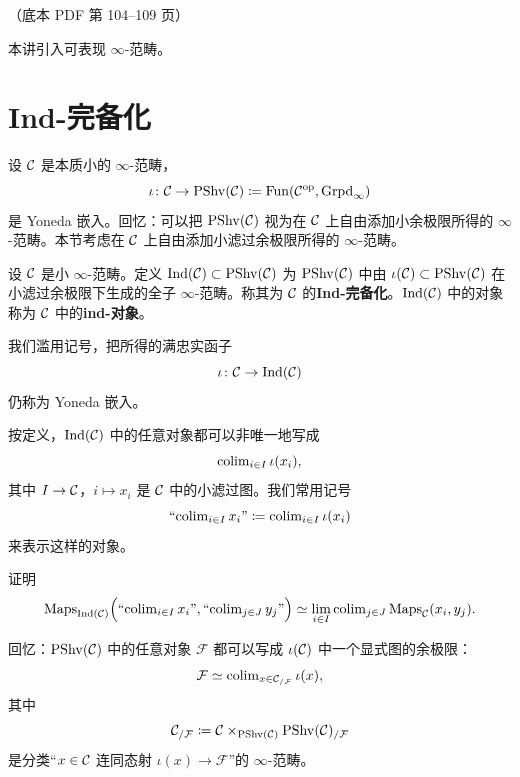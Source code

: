 \begin{center}\small\color{black!55}（底本 PDF 第 104–109 页）\end{center}

本讲引入可表现 $\infty$-范畴。

\section{Ind-完备化}

\nitem\label{L13-1.1} 设 $\mathcal{C}$ 是本质小的 $\infty$-范畴，
\[
\iota\colon\mathcal{C}\to\mathrm{PShv}(\mathcal{C})\coloneqq\operatorname{Fun}(\mathcal{C}^{\mathrm{op}},\operatorname{Grpd}_\infty)
\]
是 Yoneda 嵌入。回忆：可以把 $\mathrm{PShv}(\mathcal{C})$ 视为在 $\mathcal{C}$ 上自由添加小余极限所得的 $\infty$-范畴。本节考虑在 $\mathcal{C}$ 上自由添加小滤过余极限所得的 $\infty$-范畴。

\begin{definition}\label{L13-1.2}
设 $\mathcal{C}$ 是小 $\infty$-范畴。定义 $\operatorname{Ind}(\mathcal{C})\subset\mathrm{PShv}(\mathcal{C})$ 为 $\mathrm{PShv}(\mathcal{C})$ 中由 $\iota(\mathcal{C})\subset\mathrm{PShv}(\mathcal{C})$ 在小滤过余极限下生成的全子 $\infty$-范畴。称其为 $\mathcal{C}$ 的\textbf{Ind-完备化}。$\operatorname{Ind}(\mathcal{C})$ 中的对象称为 $\mathcal{C}$ 中的\textbf{ind-对象}。

我们滥用记号，把所得的满忠实函子
\[
\iota\colon\mathcal{C}\to\operatorname{Ind}(\mathcal{C})
\]
仍称为 Yoneda 嵌入。
\end{definition}


\nitem\label{L13-1.3} 按定义，$\operatorname{Ind}(\mathcal{C})$ 中的任意对象都可以非唯一地写成
\[
\operatorname{colim}_{i\in I}\iota(x_i),
\]
其中 $I\to\mathcal{C}$，$i\mapsto x_i$ 是 $\mathcal{C}$ 中的小滤过图。我们常用记号
\[
\text{“$\operatorname{colim}_{i\in I}x_i$”}\coloneqq\operatorname{colim}_{i\in I}\iota(x_i)
\]
来表示这样的对象。

\begin{exercise}\label{L13-1.4}
证明
\[
\mathrm{Maps}_{\operatorname{Ind}(\mathcal{C})}\Big(\text{“$\operatorname{colim}_{i\in I}x_i$”},\text{“$\operatorname{colim}_{j\in J}y_j$”}\Big)\simeq\lim_{i\in I}\operatorname{colim}_{j\in J}\mathrm{Maps}_{\mathcal{C}}(x_i,y_j).
\]
\end{exercise}

\nitem\label{L13-1.5} 回忆：$\mathrm{PShv}(\mathcal{C})$ 中的任意对象 $\mathcal{F}$ 都可以写成 $\iota(\mathcal{C})$ 中一个显式图的余极限：
\[
\mathcal{F}\simeq\operatorname{colim}_{x\in\mathcal{C}_{/\mathcal{F}}}\iota(x),
\]
其中
\[
\mathcal{C}_{/\mathcal{F}}\coloneqq\mathcal{C}\times_{\mathrm{PShv}(\mathcal{C})}\mathrm{PShv}(\mathcal{C})_{/\mathcal{F}}
\]
是分类“$x\in\mathcal{C}$ 连同态射 $\iota(x)\to\mathcal{F}$”的 $\infty$-范畴。

